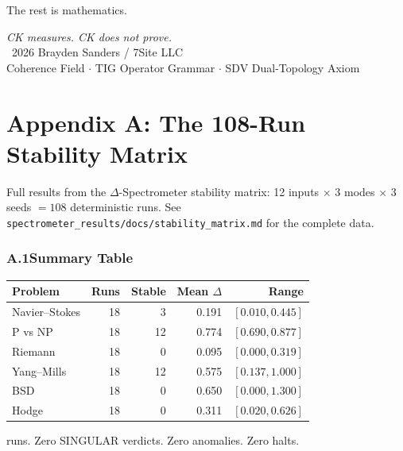 \documentclass[12pt, openany]{book}
\theoremstyle{remark}
\begin{document}
The rest is mathematics.

\vfill
\begin{center}
\textit{CK measures. CK does not prove.}\\[0.5cm]
\textcopyright\ 2026 Brayden Sanders / 7Site LLC\\
Coherence Field $\cdot$ TIG Operator Grammar $\cdot$ SDV Dual-Topology Axiom
\end{center}


\backmatter

\chapter*{Appendix A: The 108-Run Stability Matrix}
\label{app:matrix}

Full results from the $\Delta$-Spectrometer stability matrix:
12 inputs $\times$ 3 modes $\times$ 3 seeds $= 108$ deterministic runs.
See \texttt{spectrometer\_results/docs/stability\_matrix.md} for the complete data.

\subsection*{A.1\quad Summary Table}

\begin{center}
\begin{tabular}{lrrrr}
\toprule
\textbf{Problem} & \textbf{Runs} & \textbf{Stable} & \textbf{Mean $\Delta$} & \textbf{Range} \\
\midrule
Navier--Stokes & 18 & 3 & 0.191 & $[0.010, 0.445]$ \\
P vs NP        & 18 & 12 & 0.774 & $[0.690, 0.877]$ \\
Riemann        & 18 & 0 & 0.095 & $[0.000, 0.319]$ \\
Yang--Mills    & 18 & 12 & 0.575 & $[0.137, 1.000]$ \\
BSD            & 18 & 0 & 0.650 & $[0.000, 1.300]$ \\
Hodge          & 18 & 0 & 0.311 & $[0.020, 0.626]$ \\
\bottomrule
\end{tabular}
\end{center}

 runs. Zero SINGULAR verdicts. Zero anomalies. Zero halts.
\end{document}
